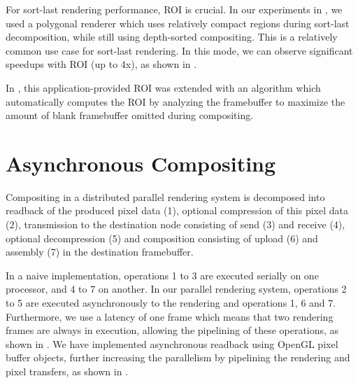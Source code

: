 For sort-last rendering performance, ROI is crucial. In our experiments in
\cite{EBAHMP:12}, we used a polygonal renderer which uses relatively compact
regions during sort-last decomposition, while still using depth-sorted
compositing. This is a relatively common use case for sort-last rendering. In
this mode, we can observe significant speedups with ROI (up to 4x), as shown in
.

In \cite{MEP:10}, this application-provided ROI was extended with an algorithm
which automatically computes the ROI by analyzing the framebuffer to maximize
the amount of blank framebuffer omitted during compositing.

\section{Asynchronous Compositing}

Compositing in a distributed parallel rendering system is decomposed into
readback of the produced pixel data (1), optional compression of this pixel data
(2), transmission to the destination node consisting of send (3) and receive
(4), optional decompression (5) and composition consisting of upload (6) and
assembly (7) in the destination framebuffer.

In a naive implementation, operations 1 to 3 are executed serially on one
processor, and 4 to 7 on another. In our parallel rendering system, operations 2
to 5 are executed asynchronously to the rendering and operations 1, 6 and 7.
Furthermore, we use a latency of one frame which means that two rendering frames
are always in execution, allowing the pipelining of these operations, as shown
in . We have implemented asynchronous readback using OpenGL pixel
buffer objects, further increasing the parallelism by pipelining the rendering
and pixel transfers, as shown in .

